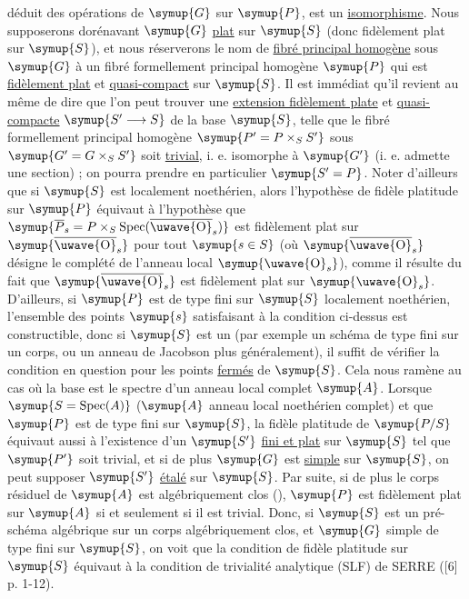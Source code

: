déduit des opérations de $\symup{G}$ sur $\symup{P}$, est un \uline{isomorphisme}. Nous supposerons
dorénavant $\symup{G}$ \uline{plat} sur $\symup{S}$ (donc fidèlement plat sur $\symup{S}$), et nous réserverons
le nom de \uline{fibré principal homogène} sous $\symup{G}$ à un fibré formellement principal
homogène $\symup{P}$ qui est \uline{fidèlement plat} et \uline{quasi-compact} sur $\symup{S}$. Il est immédiat
qu'il revient au même de dire que l'on peut trouver une \uline{extension fidèlement plate} et \uline{quasi-compacte} $\symup{S'\longrightarrow S}$ de la base $\symup{S}$, telle que le
fibré formellement principal homogène
$\symup{P'=P\times_SS'}$
sous $\symup{G'=G\times_SS'}$ soit \uline{trivial}, i. e. isomorphe à $\symup{G'}$ (i. e. admette une
section) ; on pourra prendre en particulier $\symup{S'=P}$. Noter d'ailleurs que si
$\symup{S}$ est localement noethérien, alors l'hypothèse de fidèle platitude sur $\symup{P}$
équivaut à l'hypothèse que
$\symup{\overline P_s=P\times_S\operatorname{Spec}(\overline{\text{\uwave{O}}}_s)}$
est fidèlement plat sur $\symup{\overline{\text{\uwave{O}}}_s}$ pour tout $\symup{s\in S}$ (où
$\symup{\overline{\text{\uwave{O}}}_s}$ désigne le complété de l'anneau local
$\symup{\text{\uwave{O}}_s}$), comme il résulte du fait que $\symup{\overline{\text{\uwave{O}}}_s}$ est
fidèlement plat sur $\symup{\text{\uwave{O}}_s}$. D'ailleurs, si $\symup{P}$ est de type fini sur
$\symup{S}$ localement noethérien, l'ensemble des points $\symup{s}$ satisfaisant à la
condition ci-dessus est constructible, donc si $\symup{S}$ est un  (par exemple un schéma de type fini sur un corps, ou un anneau de Jacobson plus généralement), il suffit de vérifier la condition en question
pour les points \uline{fermés} de $\symup{S}$. Cela nous ramène au cas où la base est le
spectre d'un anneau local complet $\symup{A}$. Lorsque $\symup{S=\operatorname{Spec}(A)}$
($\symup{A}$ anneau local noethérien complet) et que $\symup{P}$ est de type fini sur $\symup{S}$, la
fidèle platitude de $\symup{P/S}$ équivaut aussi à l'existence d'un $\symup{S'}$ \uline{fini et plat}
sur $\symup{S}$ tel que $\symup{P'}$ soit trivial, et si de plus $\symup{G}$ est \uline{simple} sur $\symup{S}$, on
peut supposer $\symup{S'}$ \uline{étalé} sur $\symup{S}$. Par suite, si de plus le corps résiduel de
$\symup{A}$ est algébriquement clos (), $\symup{P}$ est fidèlement plat sur
$\symup{A}$ si et seulement si il est trivial. Donc, si $\symup{S}$ est un pré-schéma
algébrique sur un corps algébriquement clos, et $\symup{G}$ simple de type fini sur
$\symup{S}$, on voit que la condition de fidèle platitude sur $\symup{S}$ équivaut à la
condition de trivialité analytique (SLF) de SERRE ([6] p. 1-12).

